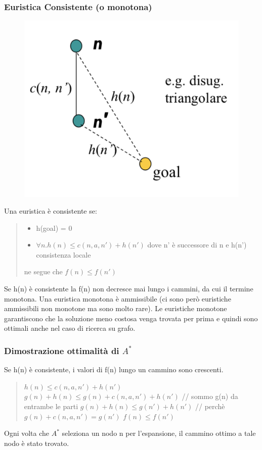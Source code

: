 \documentclass{article}
\begin{document}
\subsubsection{Euristica Consistente (o monotona)}
\begin{figure}[H]
    \centering
    \includegraphics[scale=0.5]{Images/eurconsist.png}
\end{figure}
Una euristica è consistente se:
\begin{quote}
    \begin{itemize}
    \item h(goal) = 0
    \item $\forall n . h(n) \leq c(n,a,n')+h(n')$ dove n' è successore di n e h(n') consistenza locale
    \end{itemize}
    ne segue che $f(n) \leq f(n')$
\end{quote}
Se h(n) è consistente la f(n) non decresce mai lungo i cammini, da cui il termine monotona. \newline
Una euristica monotona è ammissibile (ci sono però euristiche ammissibili non monotone ma sono molto rare). Le euristiche monotone garantiscono che la soluzione meno costosa venga trovata per prima e quindi sono ottimali anche nel caso di ricerca su grafo.

\subsubsection{Dimostrazione ottimalità di $A^*$}
Se h(n) è consistente, i valori di f(n) lungo un cammino sono crescenti.
\begin{quote}
    $h(n) \leq c(n,a,n')+h(n')$ \newline
    $g(n) + h(n) \leq g(n) + c(n,a,n')+h(n')$ // sommo g(n) da entrambe le parti\newline
    $g(n) + h(n) \leq g(n')+h(n')$ // perchè $g(n) + c(n,a,n') = g(n')$ \newline
    $f(n) \leq f(n')$
\end{quote}
Ogni volta che $A^*$ seleziona un nodo n per l'espansione, il cammino ottimo a tale nodo è stato trovato.
\end{document}
